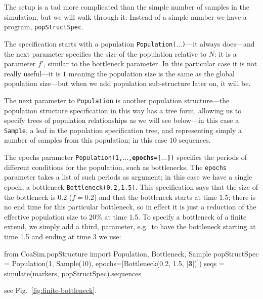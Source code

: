 \documentclass{manual}
\begin{document}
\begin{empfile}
The setup is a tad more complicated than the simple number of samples
in the simulation, but we will walk through it: Instead of a simple
number we have a program, \texttt{popStructSpec}.


The specification starts with a population
\texttt{Population($\ldots$)}---it always does---and the next
parameter specifies the size of the population relative to $N$: it is
a parameter $f'$, similar to the bottleneck parameter.  In this
particular case it is not really useful---it is $1$ meaning the
population size is the same as the global population size---but when
we add population sub-structure later on, it will be.

The next parameter to \texttt{Population} is another population
structure---the population structure specification in this way has a
tree form, allowing us to specify trees of population relationships as
we will see below---in this case a \texttt{Sample}, a leaf in the
population specification tree, and representing simply a number of
samples from this population; in this case $10$ sequences.

The epochs parameter
\texttt{Population(1,$\ldots$,\textbf{epochs=[$\ldots$]})} specifies
the periods of different conditions for the population, such as
bottlenecks.  The \texttt{epochs} parameter takes a list of such
periods as argument; in this case we have a single epoch, a bottleneck
\texttt{Bottleneck(0.2,1.5)}.  This specification says that the size
of the bottleneck is $0.2$ ($f=0.2$) and that the bottleneck starts at
time $1.5$; there is no end time for this particular bottleneck, so in
effect it is just a reduction of the effective population size to
$20\%$ at time 1.5.  To specify a bottleneck of a finite extend, we
simply add a third, parameter, e.g.\ to have the bottleneck starting
at time 1.5 and ending at time 3 we use:
\begin{code}
from CoaSim.popStructure import Population, Bottleneck, Sample
popStructSpec = Population(1, Sample(10), 
                           epochs=[Bottleneck(0.2, 1.5, |\textbf{3}|)])
seqs = simulate(markers, popStructSpec).sequences
\end{code}
see Fig.~\ref{fig:finite-bottleneck}.


\end{empfile}
\end{document}
